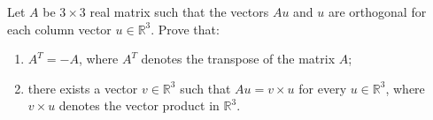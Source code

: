 \documentclass{article}
\begin{document}
	\setlength{\parindent}{0pt}
	Let $A$ be $3\times 3$ real matrix such that the vectors $Au$ and $u$ are orthogonal
	for each column vector $u \in \mathbb{R}^3$. Prove that:
	\begin{enumerate}[label=\alph*)]
		\item $A^T = -A$, where $A^T$ denotes the transpose of the matrix $A$;
		\item there exists a vector $v\in \mathbb{R}^3$ such that $Au = v \times u$ for every $u \in \mathbb{R}^3$, where $v \times u$ denotes the vector product in $\mathbb{R}^3$.
	\end{enumerate}
\end{document}
